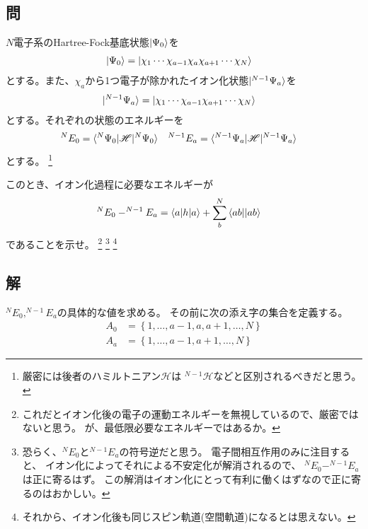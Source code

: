 \subsection{問}
$N$電子系のHartree-Fock基底状態$\ket{\Psi_0}$を
\begin{align}
	\ket{\Psi_0}
&=
	\ket{\chi_1 \cdots \chi_{a-1} \chi_a \chi_{a+1} \cdots \chi_N}
\end{align}
とする。また、$\chi_a$から1つ電子が除かれたイオン化状態$\ket{^{N-1}\Psi_a}$を
\begin{align}
	\ket{^{N-1}\Psi_a}
&=
	\ket{\chi_1 \cdots \chi_{a-1} \chi_{a+1} \cdots \chi_N}
\end{align}
とする。それぞれの状態のエネルギーを
\begin{align}
	^{N}E_0
&=
	\braket{^{N}\Psi_0|\mathscr{H}|^{N}\Psi_0} &
%
%
	^{N-1}E_a
&=
	\braket{^{N-1}\Psi_a|\mathscr{H}|^{N-1}\Psi_a}
\end{align}
とする。
	\footnote{
		厳密には後者のハミルトニアン$\mathscr{H}$は
		$^{N-1}\mathscr{H}$などと区別されるべきだと思う。
	}

このとき、イオン化過程に必要なエネルギーが
\begin{align}
	^{N}E_0
	-
	^{N-1}E_a
&=
	\braket{a|h|a}
	+
	\sum_b^N {\braket{ab||ab}}
\end{align}
であることを示せ。
	\footnote{
		これだとイオン化後の電子の運動エネルギーを無視しているので、厳密ではないと思う。
		が、最低限必要なエネルギーではあるか。
	}
	\footnote{
		恐らく、$^{N}E_0$と$^{N-1}E_a$の符号逆だと思う。
		電子間相互作用のみに注目すると、
		イオン化によってそれによる不安定化が解消されるので、
		$^{N}E_0-^{N-1}E_a$は正に寄るはず。
		この解消はイオン化にとって有利に働くはずなので正に寄るのはおかしい。
	}
	\footnote{
		それから、イオン化後も同じスピン軌道(空間軌道)になるとは思えない。
	}


\subsection{解}
$^{N}E_0,^{N-1}E_a$の具体的な値を求める。
その前に次の添え字の集合を定義する。
\begin{align}
	A_0
&=
	\left\{
		1,\dots,a-1,a,a+1,\dots,N
	\right\} \\
%
%
	A_a
&=
	\left\{
		1,\dots,a-1,a+1,\dots,N
	\right\}
\end{align}

